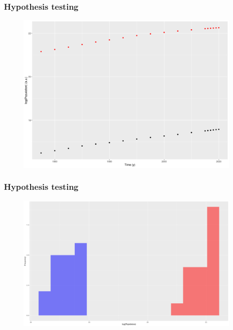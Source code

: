 \documentclass[
	11pt, %
]{beamer}
\begin{document}
\begin{frame}
	\frametitle{Hypothesis testing}
	\begin{figure}
		\includegraphics[width=.75\textwidth]{asia_oceania.png}
	\end{figure}
\end{frame}

\begin{frame}
	\frametitle{Hypothesis testing}
	\begin{figure}
		\includegraphics[width=.75\textwidth]{asia_oceania_hist.png}
	\end{figure}
\end{frame}
\end{document}
